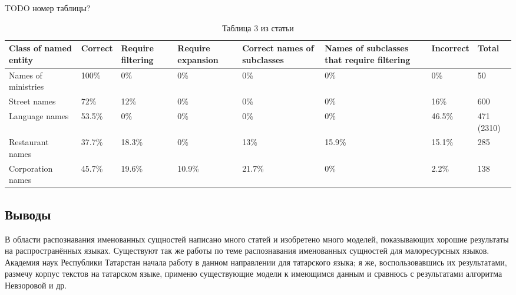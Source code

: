 TODO номер таблицы?

\begin{table}[h!]
 \begin{tabular}[h]{m{2.2cm}m{1.7cm}m{1.7cm}m{1.8cm}m{1.9cm}m{1.9cm}m{1.7cm}m{1.7cm}}

\hline
\hline
Class of named entity  & Correct & Require filtering & Require expansion & Correct names of subclasses & Names of subclasses that require filtering & Incorrect & Total \\
\hline
 Names of ministries & 100\% & 0\% & 0\% & 0\% & 0\% & 0\% & 50 \\
 \hline
 Street names & 72\% & 12\% & 0\% & 0\% & 0\% & 16\% & 600 \\
 \hline
 Language names & 53.5\% & 0\% & 0\% & 0\% & 0\% & 46.5\% & 471 (2310) \\
 \hline
 Restaurant names & 37.7\% & 18.3\% & 0\% & 13\% & 15.9\% & 15.1\% & 285 \\
 \hline
 Corporation names & 45.7\% & 19.6\% & 10.9\% & 21.7\% & 0\% & 2.2\% & 138 \\
\hline
\hline
\end{tabular}
\caption{Таблица 3 из статьи \cite{Nevzorova}}
\label{table:Nevzorova}
\end{table}

\subsection{Выводы}

В области распознавания именованных сущностей написано много статей и изобретено много моделей, показывающих хорошие результаты на распространённых языках. Существуют так же работы по теме распознавания именованных сущностей для малоресурсных языков. Академия наук Республики Татарстан начала работу в данном направлении для татарского языка; я же, воспользовавшись их результатами, размечу корпус текстов на татарском языке, применю существующие модели к имеющимся данным и сравнюсь с результатами алгоритма Невзоровой и др.



























